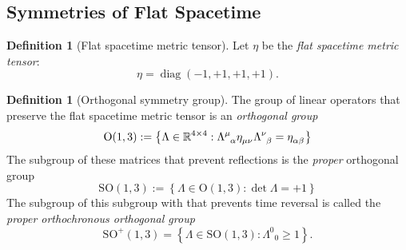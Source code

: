 \documentclass{amsart}
\theoremstyle{definition}
\newtheorem{definition}[theorem]{Definition}
\theoremstyle{remark}
\DeclareMathOperator{\diag}{diag}
\begin{document}
\subsection{Symmetries of Flat Spacetime}
\label{subsec:so13_group}
\begin{definition}[Flat spacetime metric tensor]
  Let $\eta$ be the \emph{flat spacetime metric tensor}:
  \begin{equation*}
    \eta = \diag(-1, +1, +1, +1).
  \end{equation*}
\end{definition}

\begin{definition}[Orthogonal symmetry group]\label{def:orthogonal_symmetry_group}
  The group of linear operators that preserve the flat spacetime metric tensor is an \emph{orthogonal group}
  \begin{equation*}
    \mathrm{O}(1,3) := \left\{\Lambda\in\mathbb{R}^{4\times4}: \tensor{\Lambda}{^\mu_\alpha}\tensor{\eta}{_\mu_\nu}\tensor{\Lambda}{^\nu_\beta}=\tensor{\eta}{_\alpha_\beta}\right\}
  \end{equation*}
  The subgroup of these matrices that prevent reflections is the \emph{proper} orthogonal group
  \begin{equation*}
    \mathrm{SO}(1,3) := \left\{\Lambda\in\mathrm{O}(1,3): \det\Lambda = +1\right\}
  \end{equation*}
  The subgroup of this subgroup with that prevents time reversal is called the \emph{proper orthochronous orthogonal group}
  \begin{equation*}
    \mathrm{SO}^+(1,3) = \left\{ \Lambda \in \mathrm{SO}(1,3) : \Lambda^0{}_0 \geq 1 \right\}.
  \end{equation*}
\end{definition}
\end{document}
